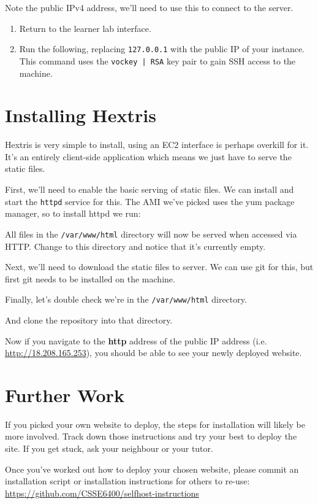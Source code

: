 \documentclass{csse4400}
\begin{document}
Note the public IPv4 address, we'll need to use this to connect to the server.

\begin{enumerate}
    \item Return to the learner lab interface.
    \item Run the following, replacing \texttt{127.0.0.1} with the public IP of your instance.
          This command uses the \texttt{vockey | RSA} key pair to gain SSH access to the machine.
\end{enumerate}

\section{Installing Hextris}
Hextris is very simple to install, using an EC2 interface is perhaps overkill for it.
It's an entirely client-side application which means we just have to serve the static files.

First, we'll need to enable the basic serving of static files.
We can install and start the \texttt{httpd} service for this.
The AMI we've picked uses the yum package manager, so to install httpd we run:


All files in the \texttt{/var/www/html} directory will now be served when accessed via HTTP.
Change to this directory and notice that it's currently empty.

Next, we'll need to download the static files to server.
We can use git for this, but first git needs to be installed on the machine.


Finally, let's double check we're in the \texttt{/var/www/html} directory.


And clone the repository into that directory.


Now if you navigate to the \textbf{http} address of the public IP address (i.e. \url{http://18.208.165.253}), you should be able to see your newly deployed website.

\section{Further Work}
If you picked your own website to deploy, the steps for installation will likely be more involved.
Track down those instructions and try your best to deploy the site.
If you get stuck, ask your neighbour or your tutor.

Once you've worked out how to deploy your chosen website,
please commit an installation script or installation instructions for others to re-use:
\url{https://github.com/CSSE6400/selfhost-instructions}



\end{document}
